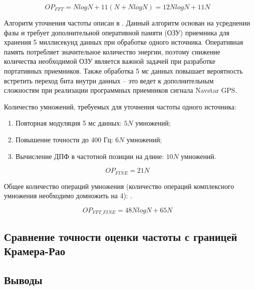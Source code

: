 \begin{center}
\begin{equation}
	\label{eq:op_fft}
	OP_{FFT} = NlogN + 11(N + NlogN) = 12NlogN + 11N
\end{equation}
\end{center}

Алгоритм уточнения частоты описан в \cite{tsui}. Данный алгоритм основан на усреднении фазы и требует дополнительной оперативной памяти (ОЗУ) приемника для
хранения 5 миллисекунд данных при обработке одного источника. Оперативная память потребляет значительное количество энергии, поэтому снижение количества
необходимой ОЗУ является важной задачей при разработке портативных приемников. Также обработка 5 мс данных повышает вероятность встретить переход бита
внутри данных – это ведет к дополнительным сложностям при реализации программных приемников сигнала Navstar GPS.

Количество умножений, требуемых для уточнения частоты одного источника:
\begin{enumerate}
\item Повторная модуляция 5 мс данных: ${5N}$ умножений;
\item Повышение точности до 400 Гц: ${6N}$ умножений;
\item Вычисление ДПФ в частотной позиции на длине: ${10N}$ умножений.
\end{enumerate}

\begin{center}
\begin{equation}
	\label{eq:op_fine}
	OP_{FINE} = 21N
\end{equation}
\end{center}

Общее количество операций умножения (количество операций комплексного умножения необходимо домножить на 4):  .
\begin{center}
\begin{equation}
	\label{eq:op_fine_fft}
	OP_{FFT\_FINE} = 48NlogN + 65N
\end{equation}
\end{center}

\subsection{Сравнение точности оценки частоты с границей Крамера-Рао}

\subsection{Выводы}

\newpage

